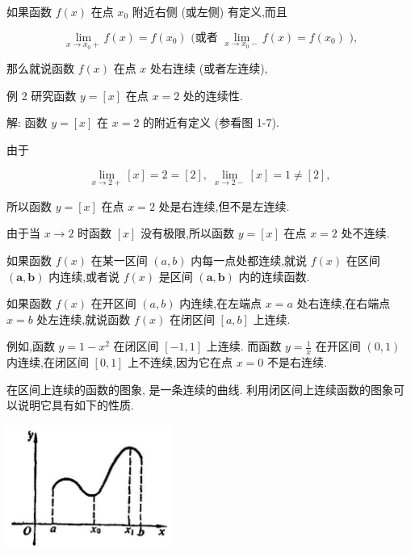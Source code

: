 \documentclass[lang=cn,newtx,10pt,scheme=chinese]{elegantbook}
\begin{document}
如果函数 \(f\left( x\right)\) 在点 \({x}_{0}\) 附近右侧 (或左侧) 有定义,而且

\[
\mathop{\lim }\limits_{{x \rightarrow {x}_{0} + }}f\left( x\right) = f\left( {x}_{0}\right) \text{ (或者 }\mathop{\lim }\limits_{{x \rightarrow {x}_{0} - }}f\left( x\right) = f\left( {x}_{0}\right) \text{ ),}
\]

那么就说函数 \(f\left( x\right)\) 在点 \(x\) 处右连续 (或者左连续),

例 2 研究函数 \(y = \left\lbrack x\right\rbrack\) 在点 \(x = 2\) 处的连续性.

解: 函数 \(y = \left\lbrack x\right\rbrack\) 在 \(x = 2\) 的附近有定义 (参看图 1-7).

由于

\[
\mathop{\lim }\limits_{{x \rightarrow 2 + }}\left\lbrack x\right\rbrack = 2 = \left\lbrack 2\right\rbrack ,\;\mathop{\lim }\limits_{{x \rightarrow 2 - }}\left\lbrack x\right\rbrack = 1 \neq \left\lbrack 2\right\rbrack ,
\]

所以函数 \(y = \left\lbrack x\right\rbrack\) 在点 \(x = 2\) 处是右连续,但不是左连续.

由于当 \(x \rightarrow 2\) 时函数 \(\left\lbrack x\right\rbrack\) 没有极限,所以函数 \(y = \left\lbrack x\right\rbrack\) 在点 \(x = 2\) 处不连续.

如果函数 \(f\left( x\right)\) 在某一区间 \(\left( {a,b}\right)\) 内每一点处都连续,就说 \(f\left( x\right)\) 在区间 \(\left( {\mathbf{a},\mathbf{b}}\right)\) 内连续,或者说 \(f\left( x\right)\) 是区间 \(\left( {\mathbf{a},\mathbf{b}}\right)\) 内的连续函数.

如果函数 \(f\left( x\right)\) 在开区间 \(\left( {a,b}\right)\) 内连续,在左端点 \(x = a\) 处右连续,在右端点 \(x = b\) 处左连续,就说函数 \(f\left( x\right)\) 在闭区间 \(\left\lbrack {a,b}\right\rbrack\) 上连续.

例如,函数 \(y = 1 - {x}^{2}\) 在闭区间 \(\left\lbrack {-1,1}\right\rbrack\) 上连续. 而函数 \(y = \frac{1}{x}\) 在开区间 \(\left( {0,1}\right)\) 内连续,在闭区间 \(\left\lbrack {0,1}\right\rbrack\) 上不连续,因为它在点 \(x = 0\) 不是右连续.

在区间上连续的函数的图象, 是一条连续的曲线. 利用闭区间上连续函数的图象可以说明它具有如下的性质.

\begin{center}
	\includegraphics[max width=0.4\textwidth]{images/01912c18-5c3f-733d-b775-749ba9897a9d_34_898703.jpg}
\end{center}
\end{document}
